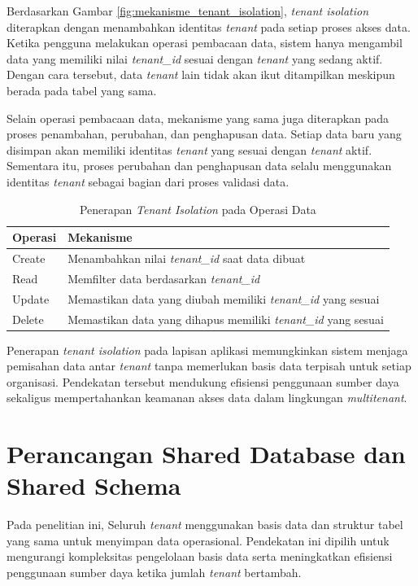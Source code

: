 Berdasarkan Gambar \ref{fig:mekanisme_tenant_isolation}, \textit{tenant isolation} diterapkan dengan menambahkan identitas \textit{tenant} pada setiap proses akses data. Ketika pengguna melakukan operasi pembacaan data, sistem hanya mengambil data yang memiliki nilai \textit{tenant\_id} sesuai dengan \textit{tenant} yang sedang aktif. Dengan cara tersebut, data \textit{tenant} lain tidak akan ikut ditampilkan meskipun berada pada tabel yang sama.

Selain operasi pembacaan data, mekanisme yang sama juga diterapkan pada proses penambahan, perubahan, dan penghapusan data. Setiap data baru yang disimpan akan memiliki identitas \textit{tenant} yang sesuai dengan \textit{tenant} aktif. Sementara itu, proses perubahan dan penghapusan data selalu menggunakan identitas \textit{tenant} sebagai bagian dari proses validasi data.

\begin{table}[H]
  \centering
  \caption{Penerapan \textit{Tenant Isolation} pada Operasi Data}
  \label{tab:penerapan_tenant_isolation}
  \begin{tabular}{|p{3cm}|p{10cm}|}
    \hline
    \rowcolor[HTML]{EFEFEF}
    \textbf{Operasi} & \textbf{Mekanisme} \\
    \hline
    Create & Menambahkan nilai \textit{tenant\_id} saat data dibuat \\
    \hline
    Read & Memfilter data berdasarkan \textit{tenant\_id} \\
    \hline
    Update & Memastikan data yang diubah memiliki \textit{tenant\_id} yang sesuai \\
    \hline
    Delete & Memastikan data yang dihapus memiliki \textit{tenant\_id} yang sesuai \\
    \hline
  \end{tabular}
\end{table}

Penerapan \textit{tenant isolation} pada lapisan aplikasi memungkinkan sistem menjaga pemisahan data antar \textit{tenant} tanpa memerlukan basis data terpisah untuk setiap organisasi. Pendekatan tersebut mendukung efisiensi penggunaan sumber daya sekaligus mempertahankan keamanan akses data dalam lingkungan \textit{multitenant}.

\section{Perancangan Shared Database dan Shared Schema}

Pada penelitian ini, Seluruh \textit{tenant} menggunakan basis data dan struktur tabel yang sama untuk menyimpan data operasional. Pendekatan ini dipilih untuk mengurangi kompleksitas pengelolaan basis data serta meningkatkan efisiensi penggunaan sumber daya ketika jumlah \textit{tenant} bertambah.

